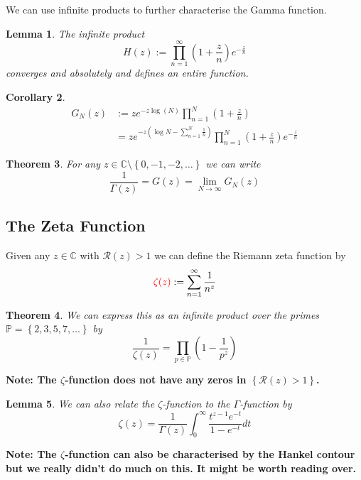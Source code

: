 \documentclass[11pt]{article}
\newcommand{\defeq}{:=}
\newcommand{\C}{\mathbb{C}}
\newenvironment{defin}
	{\begin{mdframed}[backgroundcolor=white, roundcorner=5pt, linewidth=1pt]}
	{\end{mdframed}}
\newcommand{\mdf}[1]{{\color{red} #1}}
\newenvironment{note}
	{\begin{mdframed}[backgroundcolor=white, linecolor=red, roundcorner=5pt, linewidth=1pt]\bfseries{Note:}\normalfont}
	{\end{mdframed}}
\newtheorem{theorem}{Theorem}[section]
\newtheorem{cor}[theorem]{Corollary}
\newtheorem{lemma}[theorem]{Lemma}
\begin{document}
We can use infinite products to further characterise the Gamma function.

\begin{lemma}
The infinite product
\[
	H(z)\defeq\prod_{n=1}^\infty \left(1+\frac{z}{n}\right)e^{-\frac{z}{n}}
\]
converges and absolutely and defines an entire function.
\end{lemma}

\begin{cor}
	\begin{align*}
		G_N(z)&\defeq z e^{-z\log(N)}\prod_{n=1}^N\left(1+\frac{z}{n}\right)	\\
			  &= ze^{-z\left(\log N - \sum_{n=1}^{N}\frac{1}{n}\right)}\prod_{n=1}^N\left(1+\frac{z}{n}\right)e^{-\frac{z}{n}}
	\end{align*}
\end{cor}

\begin{theorem}
For any $z\in\C\setminus\left\{0, -1, -2, \dots \right\}$ we can write
\[
	\frac{1}{\Gamma(z)}=G(z)=\lim_{N\to\infty}G_N(z)
\]
\end{theorem}

\subsection{The Zeta Function}
\begin{defin}
Given any $z\in\C$ with $\mathcal{R}(z)>1$ we can define the \mdf{Riemann zeta function} by
\[
	\mdf{\zeta(z)}\defeq\sum_{n=1}^{\infty}\frac{1}{n^z}
\]
\end{defin}

\begin{theorem}
We can express this as an infinite product over the primes $\mathbb{P}=\left\{2, 3, 5, 7, \dots\right\}$ by
\[
	\frac{1}{\zeta(z)}= \prod_{p\in\mathbb{P}}\left(1-\frac{1}{p^z}\right)
\]
\end{theorem}

\begin{note}
	The $\zeta$-function does not have any zeros in $\left\{\mathcal{R}(z)>1\right\}$.
\end{note}

\begin{lemma}
We can also relate the $\zeta$-function to the $\Gamma$-function by
\[
	\zeta(z)=\frac{1}{\Gamma(z)}\int_0^\infty\frac{t^{z-1}e^{-t}}{1-e^{-t}}dt
\]
\end{lemma}

\begin{note}
The $\zeta$-function can also be characterised by the Hankel contour but we really didn't do much on this.
It might be worth reading over.
\end{note}
\end{document}
